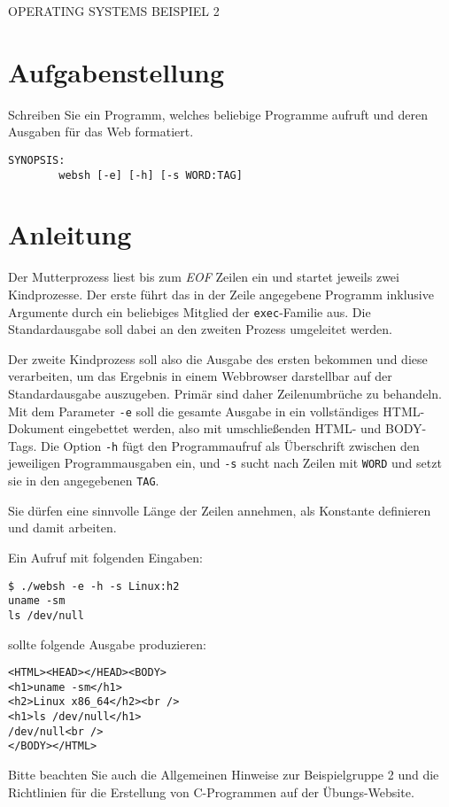 \documentclass{article}
\begin{document}
\begin{center}
\begin{Large}
OPERATING SYSTEMS BEISPIEL 2
\end{Large}
\end{center}




\section*{Aufgabenstellung}

Schreiben Sie ein Programm, welches beliebige Programme aufruft und
deren Ausgaben für das Web formatiert.

\begin{verbatim}
SYNOPSIS:
        websh [-e] [-h] [-s WORD:TAG]
\end{verbatim}



\section*{Anleitung}

Der Mutterprozess liest bis zum \textit{EOF} Zeilen ein und startet
jeweils zwei Kindprozesse. Der erste führt das in der Zeile angegebene
Programm inklusive Argumente durch ein beliebiges Mitglied der
\verb_exec_-Familie aus. Die Standardausgabe soll dabei an den zweiten
Prozess umgeleitet werden.

Der zweite Kindprozess soll also die Ausgabe des ersten bekommen und
diese verarbeiten, um das Ergebnis in einem Webbrowser darstellbar auf
der Standardausgabe auszugeben. Primär sind daher Zeilenumbrüche zu
behandeln. Mit dem Parameter \verb_-e_ soll die gesamte Ausgabe in ein
vollständiges HTML-Dokument eingebettet werden, also mit
umschließenden HTML- und BODY-Tags. Die Option \verb_-h_ fügt den
Programmaufruf als Überschrift zwischen den jeweiligen
Programmausgaben ein, und \verb_-s_ sucht nach Zeilen mit \verb_WORD_
und setzt sie in den angegebenen \verb_TAG_.

Sie dürfen eine sinnvolle Länge der Zeilen annehmen, als Konstante
definieren und damit arbeiten.

Ein Aufruf mit folgenden Eingaben: 

\begin{verbatim}
$ ./websh -e -h -s Linux:h2
uname -sm
ls /dev/null
\end{verbatim}

sollte folgende Ausgabe produzieren:

\begin{verbatim}
<HTML><HEAD></HEAD><BODY>
<h1>uname -sm</h1>
<h2>Linux x86_64</h2><br />
<h1>ls /dev/null</h1>
/dev/null<br />
</BODY></HTML> 
\end{verbatim}

Bitte beachten Sie auch die Allgemeinen Hinweise zur
Beispielgruppe 2 und die Richtlinien für die Erstellung von
C-Programmen auf der Übungs-Website.
\end{document}
